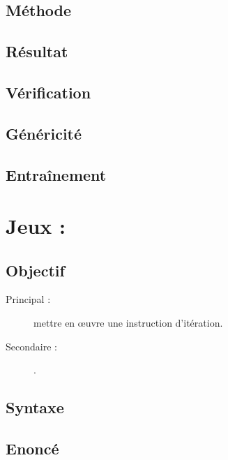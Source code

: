 \subsection{Méthode}\label{boucles:vie-courante:methode}

\subsection{Résultat}\label{boucles:vie-courante:resultat}

\subsection{Vérification}\label{boucles:vie-courante:verification}

\subsection{Généricité}\label{boucles:vie-courante:genericite}

\subsection{Entraînement}\label{boucles:vie-courante:entrainement}

\section{Jeux : }\label{boucles:jeux}

\subsection{Objectif}\label{boucles:jeux:objectif}
\begin{description}
\item[Principal : ] mettre en \oe uvre une instruction d'itération.
\item[Secondaire :] .
\end{description}

\subsection{Syntaxe \python}\label{boucles:jeux:python}

\subsection{Enoncé}\label{boucles:jeux:enonce}

